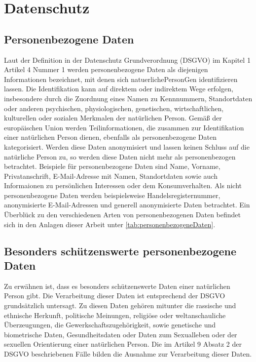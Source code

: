 \section{Datenschutz}
\subsection{Personenbezogene Daten}
Laut der Definition in der Datenschutz Grundverordnung (\gls{DSGVO}) im Kapitel 1 Artikel 4 Nummer 1 werden personenbezogene Daten als diejenigen Informationen bezeichnet, mit denen sich \gls{natuerlichePersonG}en identifizieren lassen. Die Identifikation kann auf direktem oder indirektem Wege erfolgen, insbesondere durch die Zuordnung eines Namen zu Kennnummern, Standortdaten oder anderen psychischen, physiologischen, genetischen, wirtschaftlichen, kulturellen oder sozialen Merkmalen der natürlichen Person. \cite{DSGVO_Art4} Gemäß der europäischen Union werden Teilinformationen, die zusammen zur Identifikation einer natürlichen Person dienen, ebenfalls als personenbezogene Daten kategorisiert. Werden diese Daten anonymisiert und lassen keinen Schluss auf die natürliche Person zu, so werden diese Daten nicht mehr als personenbezogen betrachtet. Beispiele für personenbezogene Daten sind Name, Vorname, Privatanschrift, E-Mail-Adresse mit Namen, Standortdaten sowie auch Informaionen zu persönlichen Interessen oder dem Konsumverhalten. Als nicht personenbezogene Daten werden beispielsweise Handelsregisternummer, anonymisierte E-Mail-Adressen und generell anonymisierte Daten betrachtet. \cite{PersBezDaten_2021} Ein Überblück zu den verschiedenen Arten von personenbezogenen Daten befindet sich in den Anlagen dieser Arbeit unter \ref{tab:personenbezogeneDaten}.

\subsection{Besonders schützenswerte personenbezogene Daten} \label{DSGVO_besonders}
Zu erwähnen ist, dass es besonders schützenswerte Daten einer natürlichen Person gibt. Die Verarbeitung dieser Daten ist entsprechend der DSGVO grundsätzlich untersagt. Zu diesen Daten gehören mitunter die rassische und ethnische Herkunft, politische Meinungen, religiöse oder weltanschauliche Überzeugungen, die Gewerkschaftszugehörigkeit, sowie genetische und biometrische Daten, Gesundheitsdaten oder Daten zum Sexualleben oder der sexuellen Orientierung einer natürlichen Person. Die im Artikel 9 Absatz 2 der DSGVO beschriebenen Fälle bilden die Ausnahme zur Verarbeitung dieser Daten. \cite{DSGVO_Art9}